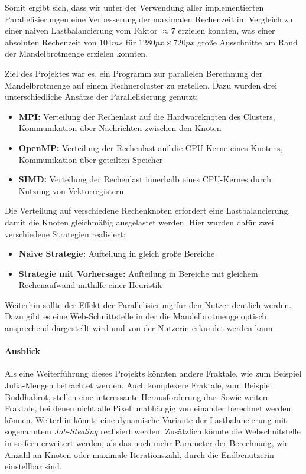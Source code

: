 Somit ergibt sich, dass wir unter der Verwendung aller implementierten Parallelisierungen eine Verbesserung
der maximalen Rechenzeit im Vergleich zu einer naiven Lastbalancierung vom Faktor \( \approx 7 \) erzielen konnten,
was einer absoluten Rechenzeit von \( 104ms \) für \( 1280px \times 720px \) große Ausschnitte am Rand der Mandelbrotmenge erzielen konnten.

\pagebreak
Ziel des Projektes war es, ein Programm zur parallelen Berechnung der Mandelbrotmenge auf einem Rechnercluster zu erstellen.
Dazu wurden drei unterschiedliche Ansätze der Parallelisierung genutzt:
\begin{itemize}
	\item \textbf{MPI:} Verteilung der Rechenlast auf die Hardwareknoten des Clusters, Kommunikation über Nachrichten zwischen den Knoten
	\item \textbf{OpenMP:} Verteilung der Rechenlast auf die CPU-Kerne eines Knotens, Kommunikation über geteilten Speicher
	\item \textbf{SIMD:} Verteilung der Rechenlast innerhalb eines CPU-Kernes durch Nutzung von Vektorregistern
\end{itemize}

Die Verteilung auf verschiedene Rechenknoten erfordert eine Lastbalancierung, damit die Knoten gleichmäßig ausgelastet werden.
Hier wurden dafür zwei verschiedene Strategien realisiert:
\begin{itemize}
	\item \textbf{Naive Strategie:} Aufteilung in gleich große Bereiche
	\item \textbf{Strategie mit Vorhersage:} Aufteilung in Bereiche mit gleichem Rechenaufwand mithilfe einer Heuristik
\end{itemize}

Weiterhin sollte der Effekt der Parallelisierung für den Nutzer deutlich werden.
Dazu gibt es eine Web-Schnittstelle in der die Mandelbrotmenge optisch ansprechend dargestellt wird und von der Nutzerin erkundet werden kann.

\paragraph{Ausblick}
Als eine Weiterführung dieses Projekts könnten andere Fraktale,
wie zum Beispiel Julia-Mengen betrachtet werden.
Auch komplexere Fraktale, zum Beispiel Buddhabrot, stellen eine interessante Herausforderung dar. Sowie weitere Fraktale,
bei denen nicht alle Pixel unabhängig von einander berechnet werden können.
Weiterhin könnte eine dynamische Variante der Lastbalancierung mit sogenanntem \textit{Job-Stealing} realisiert werden.
Zusätzlich könnte die Webschnitstelle in so fern erweitert werden, als das noch mehr
Parameter der Berechnung, wie Anzahl an Knoten oder maximale Iterationszahl, durch die Endbenutzerin einstellbar sind.